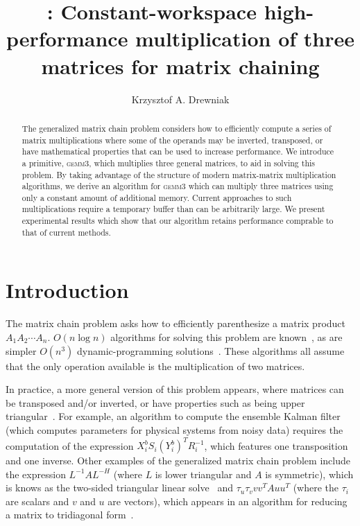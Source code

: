 \documentclass[12pt]{article}
\title{\gemmt{}: Constant-workspace high-performance multiplication of three matrices for matrix chaining}
\author{Krzysztof A. Drewniak}
\newcommand*{\gemmt}{{\textsc{gemm3}}}
\newcommand*{\mycite}[1]{~\cite{#1}}
\begin{document}
\maketitle{}
\begin{abstract}
  The generalized matrix chain problem considers how to efficiently compute a series of matrix multiplications where some of the operands may be inverted, transposed, or have mathematical properties that can be used to increase performance.
  We introduce a primitive, \gemmt{}, which multiplies three general matrices, to aid in solving this problem.
  By taking advantage of the structure of modern matrix-matrix multiplication algorithms, we derive an algorithm for \gemmt{} which can multiply three matrices using only a constant amount of additional memory.
  Current approaches to such multiplications require a temporary buffer than can be arbitrarily large.
  We present experimental results which show that our algorithm retains performance comprable to that of current methods.
\end{abstract}

\section{Introduction}
The matrix chain problem asks how to efficiently parenthesize a matrix product $A_1A_2\cdots A_n$.
$O(n \log n)$ algorithms for solving this problem are known\mycite{Hu1984}, as are simpler $O(n^3)$ dynamic-programming solutions\mycite{Barthels2018}.
These algorithms all assume that the only operation available is the multiplication of two matrices.

In practice, a more general version of this problem appears, where matrices can be transposed and/or inverted, or have properties such as being upper triangular\mycite{Barthels2018}.
For example, an algorithm to compute the ensemble Kalman filter\mycite{Rao2017} (which computes parameters for physical systems from noisy data) requires the computation of the expression $X_i^b S_i (Y_i^b)^T R_i^{-1}$, which features one transposition and one inverse.
Other examples of the generalized matrix chain problem include the expression $L^{-1}AL^{-H}$ (where $L$ is lower triangular and $A$ is symmetric), which is knows as the two-sided triangular linear solve\mycite{Parikh2017} and $\tau_u\tau_v vv^TAuu^T$ (where the $\tau_i$ are scalars and $v$ and $u$ are vectors), which appears in an algorithm for reducing a matrix to tridiagonal form\mycite{Choi1995}.
\end{document}

